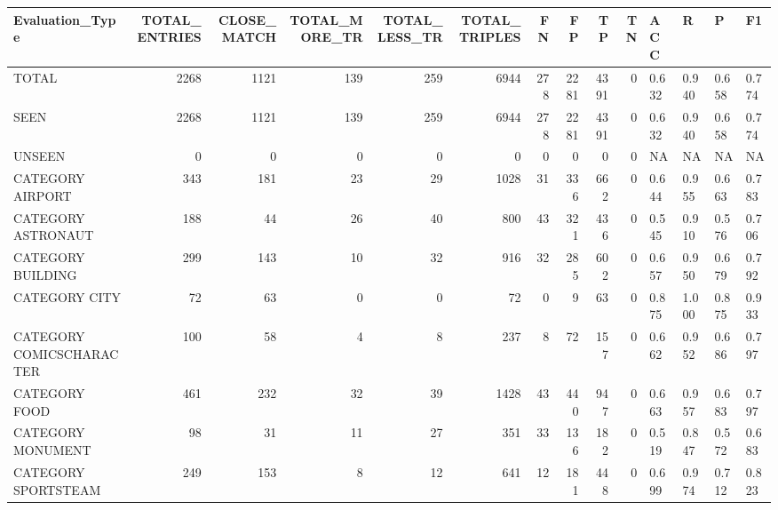 \begin{tabular}{lrrrrrrrrrllll}
\hline
 Evaluation\_Type          &   TOTAL\_ENTRIES &   CLOSE\_MATCH &   TOTAL\_MORE\_TR &   TOTAL\_LESS\_TR &   TOTAL\_TRIPLES &   FN &   FP &   TP &   TN & ACC   & R     & P     & F1    \\
\hline
 TOTAL                    &            2268 &          1121 &             139 &             259 &            6944 &  278 & 2281 & 4391 &    0 & 0.632 & 0.940 & 0.658 & 0.774 \\
 SEEN                     &            2268 &          1121 &             139 &             259 &            6944 &  278 & 2281 & 4391 &    0 & 0.632 & 0.940 & 0.658 & 0.774 \\
 UNSEEN                   &               0 &             0 &               0 &               0 &               0 &    0 &    0 &    0 &    0 & NA    & NA    & NA    & NA    \\
 CATEGORY AIRPORT         &             343 &           181 &              23 &              29 &            1028 &   31 &  336 &  662 &    0 & 0.644 & 0.955 & 0.663 & 0.783 \\
 CATEGORY ASTRONAUT       &             188 &            44 &              26 &              40 &             800 &   43 &  321 &  436 &    0 & 0.545 & 0.910 & 0.576 & 0.706 \\
 CATEGORY BUILDING        &             299 &           143 &              10 &              32 &             916 &   32 &  285 &  602 &    0 & 0.657 & 0.950 & 0.679 & 0.792 \\
 CATEGORY CITY            &              72 &            63 &               0 &               0 &              72 &    0 &    9 &   63 &    0 & 0.875 & 1.000 & 0.875 & 0.933 \\
 CATEGORY COMICSCHARACTER &             100 &            58 &               4 &               8 &             237 &    8 &   72 &  157 &    0 & 0.662 & 0.952 & 0.686 & 0.797 \\
 CATEGORY FOOD            &             461 &           232 &              32 &              39 &            1428 &   43 &  440 &  947 &    0 & 0.663 & 0.957 & 0.683 & 0.797 \\
 CATEGORY MONUMENT        &              98 &            31 &              11 &              27 &             351 &   33 &  136 &  182 &    0 & 0.519 & 0.847 & 0.572 & 0.683 \\
 CATEGORY SPORTSTEAM      &             249 &           153 &               8 &              12 &             641 &   12 &  181 &  448 &    0 & 0.699 & 0.974 & 0.712 & 0.823 \\

\end{tabular}
